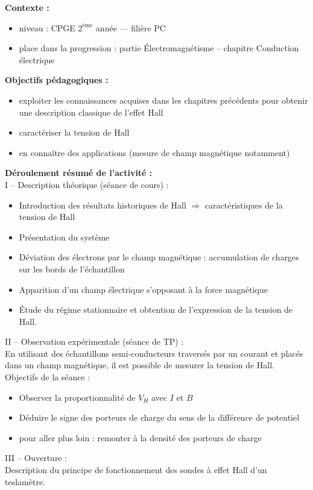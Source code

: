 \documentclass[a4paper,11pt]{article} %
\newenvironment{encart}[1]{%
	\begin{tcolorbox}
		[
		breakable, enhanced jigsaw, %
		arc = 1mm, %
		title = \textbf{#1}, %
		coltitle = white, %
		colbacktitle = blue, %
		colback = white, %
		colframe = blue %
		]
}{		
	\end{tcolorbox}
}
\begin{document}
	\begin{encart}{Activité pédagogique 1 : étude de l'effet Hall classique}
		\textbf{Contexte :}
		\begin{itemize}
			\item niveau : CPGE $ 2^\text{ème} $ année --- filière PC
			\item place dans la progression : partie \'Electromagnétisme -- chapitre Conduction électrique
		\end{itemize}
		\vspace{0.5cm}
		
		\textbf{Objectifs pédagogiques :}
		\begin{itemize}
			\item exploiter les connaissances acquises dans les chapitres précédents pour obtenir une description classique de l'effet Hall
			\item caractériser la tension de Hall
			\item en connaître des applications (mesure de champ magnétique notamment)
		\end{itemize}
		\vspace{0.5cm}
		
		\textbf{Déroulement résumé de l'activité :}\\
		I -- Description théorique (séance de cours) :
		\begin{itemize}
			\item Introduction des résultats historiques de Hall $ \Rightarrow $ caractéristiques de la tension de Hall
			\item Présentation du système
			\item Déviation des électrons par le champ magnétique : accumulation de charges sur les bords de l'échantillon
			\item Apparition d'un champ électrique s'opposant à la force magnétique
			\item \'Etude du régime stationnaire et obtention de l'expression de la tension de Hall.
		\end{itemize}
		\vspace{0.5cm}
		
		II -- Observation expérimentale (séance de TP) :\\
		En utilisant des échantillons semi-conducteurs traversés par un courant et placés dans un champ magnétique, il est possible de mesurer la tension de Hall.\\
		Objectifs de la séance :
		\begin{itemize}
			\item Observer la proportionnalité de $ V_H $ avec $ I $ et $ B $
			\item Déduire le signe des porteurs de charge du sens de la différence de potentiel
			\item pour aller plus loin : remonter à la densité des porteurs de charge
		\end{itemize}
		
		\vspace{0.5cm}
		III -- Ouverture :\\
		Description du principe de fonctionnement des sondes à effet Hall d'un teslamètre.
	\end{encart}
	
\end{document}
